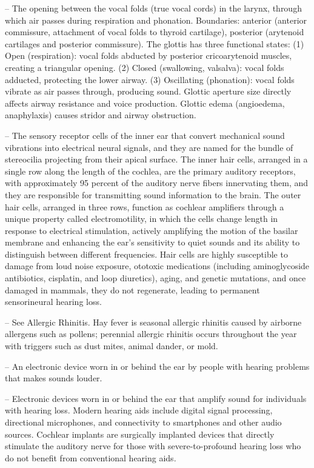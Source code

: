 -- The opening between the vocal folds (true vocal cords) in the larynx, through which air passes during respiration and phonation. Boundaries: anterior (anterior commissure, attachment of vocal folds to thyroid cartilage), posterior (arytenoid cartilages and posterior commissure). The glottis has three functional states: (1) Open (respiration): vocal folds abducted by posterior cricoarytenoid muscles, creating a triangular opening. (2) Closed (swallowing, valsalva): vocal folds adducted, protecting the lower airway. (3) Oscillating (phonation): vocal folds vibrate as air passes through, producing sound. Glottic aperture size directly affects airway resistance and voice production. Glottic edema (angioedema, anaphylaxis) causes stridor and airway obstruction.

-- The sensory receptor cells of the inner ear that convert mechanical sound vibrations into electrical neural signals, and they are named for the bundle of stereocilia projecting from their apical surface. The inner hair cells, arranged in a single row along the length of the cochlea, are the primary auditory receptors, with approximately 95 percent of the auditory nerve fibers innervating them, and they are responsible for transmitting sound information to the brain. The outer hair cells, arranged in three rows, function as cochlear amplifiers through a unique property called electromotility, in which the cells change length in response to electrical stimulation, actively amplifying the motion of the basilar membrane and enhancing the ear’s sensitivity to quiet sounds and its ability to distinguish between different frequencies. Hair cells are highly susceptible to damage from loud noise exposure, ototoxic medications (including aminoglycoside antibiotics, cisplatin, and loop diuretics), aging, and genetic mutations, and once damaged in mammals, they do not regenerate, leading to permanent sensorineural hearing loss.

-- See Allergic Rhinitis. Hay fever is seasonal allergic rhinitis caused by airborne allergens such as pollens; perennial allergic rhinitis occurs throughout the year with triggers such as dust mites, animal dander, or mold.

-- An electronic device worn in or behind the ear by people with hearing problems that makes sounds louder.

-- Electronic devices worn in or behind the ear that amplify sound for individuals with hearing loss. Modern hearing aids include digital signal processing, directional microphones, and connectivity to smartphones and other audio sources. Cochlear implants are surgically implanted devices that directly stimulate the auditory nerve for those with severe-to-profound hearing loss who do not benefit from conventional hearing aids.

